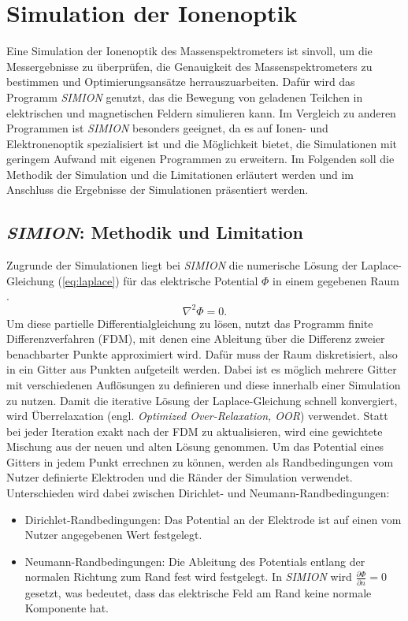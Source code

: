 \chapter{Simulation der Ionenoptik}
\label{chap:Simulation}
Eine Simulation der Ionenoptik des Massenspektrometers ist sinvoll, um die Messergebnisse zu überprüfen, die Genauigkeit des Massenspektrometers zu bestimmen und Optimierungsansätze herrauszuarbeiten. Dafür wird das Programm \textit{SIMION} genutzt, das die Bewegung von geladenen Teilchen in elektrischen und magnetischen Feldern simulieren kann. Im Vergleich zu anderen Programmen ist \textit{SIMION} besonders geeignet, da es auf Ionen- und Elektronenoptik spezialisiert ist und die Möglichkeit bietet, die Simulationen mit geringem Aufwand mit eigenen Programmen zu erweitern. Im Folgenden soll die Methodik der Simulation und die Limitationen erläutert werden und im Anschluss die Ergebnisse der Simulationen präsentiert werden.

\section{\textit{SIMION}: Methodik und Limitation}
Zugrunde der Simulationen liegt bei \textit{SIMION} die numerische Lösung der Laplace-Gleichung (\ref{eq:laplace}) für das elektrische Potential $\Phi$ in einem gegebenen Raum \cite{SIMION}.
\begin{equation}
    \label{eq:laplace}
    \nabla^2 \Phi = 0.
\end{equation}
Um diese partielle Differentialgleichung zu lösen, nutzt das Programm finite Differenzverfahren (FDM), mit denen eine Ableitung über die Differenz zweier benachbarter Punkte approximiert wird. Dafür muss der Raum diskretisiert, also in ein Gitter aus Punkten aufgeteilt werden. Dabei ist es möglich mehrere Gitter mit verschiedenen Auflösungen zu definieren und diese innerhalb einer Simulation zu nutzen. Damit die iterative Lösung der Laplace-Gleichung schnell konvergiert, wird Überrelaxation (engl. \textit{Optimized Over-Relaxation, OOR}) verwendet. Statt bei jeder Iteration exakt nach der FDM zu aktualisieren, wird eine gewichtete Mischung aus der neuen und alten Lösung genommen. Um das Potential eines Gitters in jedem Punkt errechnen zu können, werden als Randbedingungen vom Nutzer definierte Elektroden und die Ränder der Simulation verwendet. Unterschieden wird dabei zwischen Dirichlet- und Neumann-Randbedingungen:
\begin{itemize}
    \item {Dirichlet-Randbedingungen:} Das Potential an der Elektrode ist auf einen vom Nutzer angegebenen Wert festgelegt.
    \item {Neumann-Randbedingungen:} Die Ableitung des Potentials entlang der normalen Richtung zum Rand fest wird festgelegt. In \textit{SIMION} wird $\frac{\partial \Phi}{\partial n} = 0$ gesetzt, was bedeutet, dass das elektrische Feld am Rand keine normale Komponente hat.
\end{itemize}

